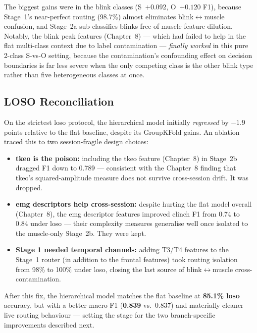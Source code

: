 The biggest gains were in the blink classes (S~$+0.092$,
O~$+0.120$ F1), because Stage~1's near-perfect routing (98.7\%)
almost eliminates blink$\leftrightarrow$muscle confusion, and
Stage~2a sub-classifies blinks free of muscle-feature dilution.
Notably, the blink peak features (Chapter~8) --- which had failed
to help in the flat multi-class context due to label contamination
--- \emph{finally worked} in this pure 2-class S-vs-O setting,
because the contamination's confounding effect on decision
boundaries is far less severe when the only competing class is the
other blink type rather than five heterogeneous classes at once.

\subsection{LOSO Reconciliation}

On the strictest \acrshort{loso} protocol, the hierarchical model
initially \emph{regressed} by $-1.9$ points relative to the flat
baseline, despite its GroupKFold gains. An ablation traced this to
two session-fragile design choices:

\begin{itemize}[leftmargin=*]
    \item \textbf{\acrshort{tkeo} is the poison:} including the
    \acrshort{tkeo} feature (Chapter~8) in Stage~2b dragged
     F1 down to 0.789 --- consistent with the
    Chapter~8 finding that \acrshort{tkeo}'s squared-amplitude
    measure does not survive cross-session drift. It was dropped.
    \item \textbf{\acrshort{emg} descriptors help cross-session:}
    despite hurting the flat model overall (Chapter~8), the
    \acrshort{emg} descriptor features improved clinch F1 from
    0.74 to 0.84 under \acrshort{loso} --- their complexity
    measures generalise well once isolated to the muscle-only
    Stage~2b. They were kept.
    \item \textbf{Stage 1 needed temporal channels:} adding T3/T4
    features to the Stage~1 router (in addition to the frontal
    features) took routing isolation from 98\% to 100\% under
    \acrshort{loso}, closing the last source of
    blink$\leftrightarrow$muscle cross-contamination.
\end{itemize}

After this fix, the hierarchical model matches the flat baseline at
\textbf{85.1\% \acrshort{loso}} accuracy, but with a better
macro-F1 (\textbf{0.839} vs.\ 0.837) and materially cleaner live
routing behaviour --- setting the stage for the two branch-specific
improvements described next.

